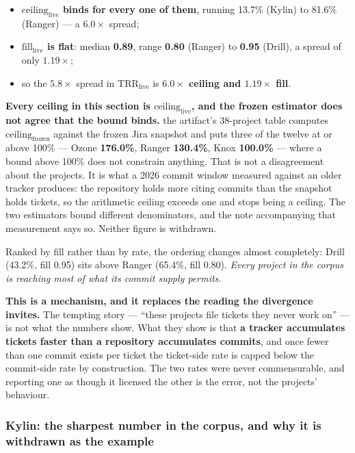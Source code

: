 \documentclass[sigconf,review,anonymous]{acmart}
\begin{document}
\begin{itemize}
\item \textbf{$\mathrm{ceiling}_\mathrm{live}$ binds for every one of them}, running 13.7\% (Kylin) to 81.6\% (Ranger) --- a $6.0\times$ spread;
\item \textbf{$\mathrm{fill}_\mathrm{live}$ is flat}: median \textbf{0.89}, range \textbf{0.80} (Ranger) to \textbf{0.95} (Drill), a spread of only \textbf{$1.19\times$};
\item so the $5.8\times$ spread in $\mathrm{TRR}_\mathrm{live}$ is \textbf{$6.0\times$ ceiling and $1.19\times$ fill}.
\end{itemize}

\textbf{Every ceiling in this section is $\mathrm{ceiling}_\mathrm{live}$, and the frozen estimator does not agree that the bound binds.} the artifact's 38-project table computes $\mathrm{ceiling}_\mathrm{frozen}$ against the frozen Jira snapshot and puts three of the twelve at or above 100\% --- Ozone \textbf{176.0\%}, Ranger \textbf{130.4\%}, Knox \textbf{100.0\%} --- where a bound above 100\% does not constrain anything. That is not a disagreement about the projects. It is what a 2026 commit window measured against an older tracker produces: the repository holds more citing commits than the snapshot holds tickets, so the arithmetic ceiling exceeds one and stops being a ceiling. The two estimators bound different denominators, and the note accompanying that measurement says so. Neither figure is withdrawn.

Ranked by fill rather than by rate, the ordering changes almost completely: Drill (43.2\%, fill 0.95) sits above Ranger (65.4\%, fill 0.80). \emph{Every project in the corpus is reaching most of what its commit supply permits.}

\textbf{This is a mechanism, and it replaces the reading the divergence invites.} The tempting story --- ``these projects file tickets they never work on'' --- is not what the numbers show. What they show is that \textbf{a tracker accumulates tickets faster than a repository accumulates commits}, and once fewer than one commit exists per ticket the ticket-side rate is capped below the commit-side rate by construction. The two rates were never commensurable, and reporting one as though it licensed the other is the error, not the projects' behaviour.

\subsubsection{Kylin: the sharpest number in the corpus, and why it is withdrawn as the example}
\label{sec:4.2.1}
\end{document}
